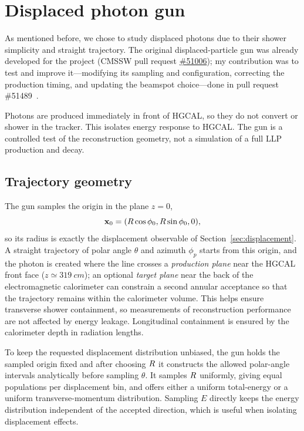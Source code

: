 \section{Displaced photon gun}
\label{sec:gun}

As mentioned before, we chose to study displaced photons due to their shower simplicity and straight trajectory. The original displaced-particle gun was already developed for the project (CMSSW pull request
\href{https://github.com/cms-sw/cmssw/pull/51006}{\#51006}); my contribution was
to test and improve it---modifying its sampling and configuration, correcting the
production timing, and updating the beamspot choice---done in pull request
\#51489~\cite{DoljaninPR51489}.

Photons are produced immediately in front of HGCAL, so they do not convert or shower
in the tracker. This isolates energy response to HGCAL. The gun is a controlled test of the reconstruction geometry, not a simulation of
a full LLP production and decay.

\subsection{Trajectory geometry}

The gun samples the origin in the plane $z=0$,
\begin{equation}
  \mathbf{x}_0=(R\cos\phi_0,R\sin\phi_0,0),
\end{equation}
so its radius is exactly the displacement observable of
Section~\ref{sec:displacement}. A straight trajectory of polar angle $\theta$
and azimuth $\phi_p$ starts from this origin, and the photon is created
where the line crosses a \emph{production plane} near the HGCAL front face
($z\simeq\SI{319}{cm}$); an optional \emph{target plane} near the back of the
electromagnetic calorimeter can constrain a second annular acceptance so that the
trajectory remains within the calorimeter volume. This helps ensure transverse
shower containment, so measurements of reconstruction performance are not
affected by energy leakage. Longitudinal containment is
ensured by the calorimeter depth in radiation lengths.

To keep the requested displacement distribution unbiased, the gun holds the
sampled origin fixed and after choosing $R$ it constructs the allowed polar-angle intervals
analytically before sampling $\theta$. It samples $R$ uniformly, giving equal populations per
displacement bin, and offers either a uniform total-energy or a uniform
transverse-momentum distribution. Sampling $E$ directly keeps the energy
distribution independent of the accepted direction, which is useful when
isolating displacement effects.

